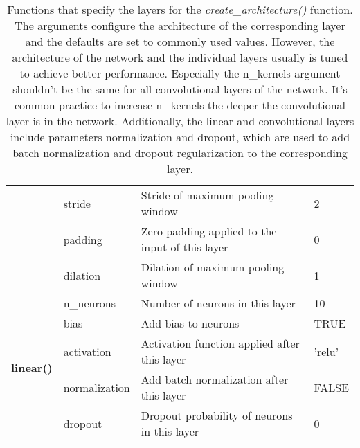 \documentclass{article}
\newcommand{\fn}[2][]{\textit{#2(}#1\textit{)}}
\begin{document}
\begin{table}
{\begin{tabular}{|llll|}
			& stride        & Stride of maximum-pooling window                                                                                                  & 2         \\
			& padding       & Zero-padding applied to the input of this layer                                                                                   & 0         \\
			& dilation      & Dilation of maximum-pooling window                                                                                                & 1         \\ \hline
			\multirow{5}{*}{\textbf{linear()}}   & n\_neurons    & Number of neurons in this layer                                                                                                   & 10        \\
			& bias          & Add bias to neurons                                                                                                               & TRUE      \\
			& activation    & Activation function applied after this layer                                                                                      & 'relu'    \\
			& normalization & Add batch normalization after this layer                                                                                          & FALSE     \\
			& dropout       & Dropout probability of neurons in this layer                                                                                      & 0         \\ \hline
		\end{tabular}
	}
	\caption{Functions that specify the layers for the \fn{create\_architecture} function. The arguments configure the architecture of the corresponding layer and the defaults are set to commonly used values. However, the architecture of the network and the individual layers usually is tuned to achieve better performance. Especially the n\_kernels argument shouldn't be the same for all convolutional layers of the network. It's common practice to increase n\_kernels the deeper the convolutional layer is in the network. Additionally, the linear and convolutional layers include parameters normalization and dropout, which are used to add batch normalization and dropout regularization to the corresponding layer.}

\end{table}
\end{document}
